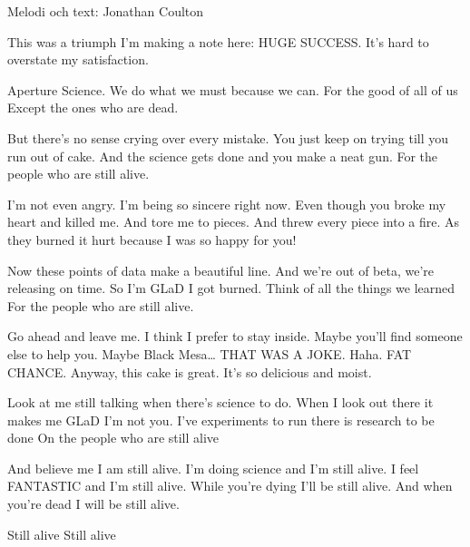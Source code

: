 \begin{song}

\begin{songmeta}
Melodi och text: Jonathan Coulton
\end{songmeta}

\begin{songtext}
This was a triumph
I'm making a note here:
HUGE SUCCESS.
It's hard to overstate my satisfaction.

Aperture Science.
We do what we must because we can.
For the good of all of us
Except the ones who are dead.

But there's no sense crying over every mistake.
You just keep on trying till you run out of cake.
And the science gets done and you make a neat gun.
For the people who are still alive.

I'm not even angry.
I'm being so sincere right now.
Even though you broke my heart and killed me.
And tore me to pieces.
And threw every piece into a fire.
As they burned it hurt because
I was so happy for you!

\newpage
Now these points of data make a beautiful line.
And we're out of beta, we're releasing on time.
So I'm GLaD I got burned.
Think of all the things we learned
For the people who are still alive.

Go ahead and leave me.
I think I prefer to stay inside.
Maybe you'll find someone else to help you.
Maybe Black Mesa\ldots
THAT WAS A JOKE. Haha. FAT CHANCE.
Anyway, this cake is great.
It's so delicious and moist.

Look at me still talking when there's science to do.
When I look out there it makes me GLaD I'm not you.
I've experiments to run there is research to be done
On the people who are still alive

And believe me I am still alive.
I'm doing science and I'm still alive.
I feel FANTASTIC and I'm still alive.
While you're dying I'll be still alive.
And when you're dead I will be still alive.

Still alive
Still alive
\end{songtext}
\end{song}
